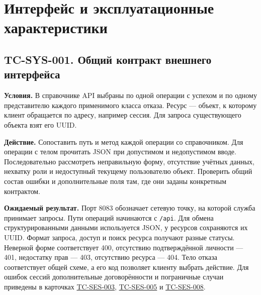 \documentclass[12pt,a4paper]{article}
\begin{document}
\section{Интерфейс и эксплуатационные характеристики}\label{ux438ux43dux442ux435ux440ux444ux435ux439ux441-ux438-ux44dux43aux441ux43fux43bux443ux430ux442ux430ux446ux438ux43eux43dux43dux44bux435-ux445ux430ux440ux430ux43aux442ux435ux440ux438ux441ux442ux438ux43aux438}

\hypertarget{интерфейс-и-эксплуатационные-характеристики}{}

\subsection{TC-SYS-001. Общий контракт внешнего интерфейса}\label{tc-sys-001-ux43eux431ux449ux438ux439-ux43aux43eux43dux442ux440ux430ux43aux442-ux432ux43dux435ux448ux43dux435ux433ux43e-ux438ux43dux442ux435ux440ux444ux435ux439ux441ux430}

\hypertarget{tc-sys-001-общий-контракт-внешнего-интерфейса}{}

\hypertarget{tc-sys-001}{}

\textbf{Условия.} В справочнике API выбраны по одной операции с успехом и по одному представителю каждого применимого класса отказа. Ресурс --- объект, к которому клиент обращается по адресу, например сессия. Для запроса существующего объекта взят его UUID.

\textbf{Действие.} Сопоставить путь и метод каждой операции со справочником. Для операции с телом прочитать JSON при допустимом и недопустимом вводе. Последовательно рассмотреть неправильную форму, отсутствие учётных данных, нехватку роли и недоступный текущему пользователю объект. Проверить общий состав ошибки и дополнительные поля там, где они заданы конкретным контрактом.

\textbf{Ожидаемый результат.} Порт 8083 обозначает сетевую точку, на которой служба принимает запросы. Пути операций начинаются с \texttt{/api}. Для обмена структурированными данными используется JSON, у ресурсов сохраняются их UUID. Формат запроса, доступ и поиск ресурса получают разные статусы. Неверной форме соответствует 400, отсутствию подтверждённой личности --- 401, недостатку прав --- 403, отсутствию ресурса --- 404. Тело отказа соответствует общей схеме, а его код позволяет клиенту выбрать действие. Для ошибок сессий дополнительные договорённости и пограничные случаи приведены в карточках {\hyperlink{tc-ses-003}{TC-SES-003}}, {\hyperlink{tc-ses-005}{TC-SES-005}} и {\hyperlink{tc-ses-008}{TC-SES-008}}.
\end{document}
